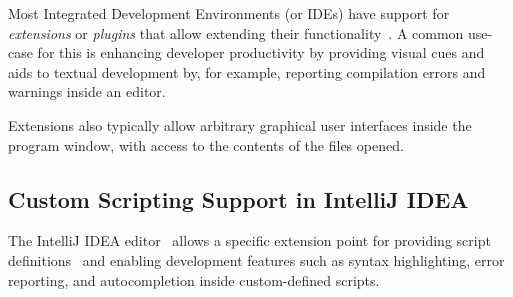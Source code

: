 Most Integrated Development Environments (or IDEs) have support for \emph{extensions} or \emph{plugins} that allow extending their functionality~\cite{ideaExtensionPoints, vscodeExtensions}.
A common use-case for this is enhancing developer productivity by providing visual cues and aids to textual development by, for example, reporting compilation errors and warnings inside an editor.

Extensions also typically allow arbitrary graphical user interfaces inside the program window, with access to the contents of the files opened.

\subsection{Custom Scripting Support in IntelliJ IDEA}\label{subsec:scripting-in-intellij}

The IntelliJ IDEA editor~\cite{intelliJRepo} allows a specific extension point for providing script definitions~\cite{kotlinScriptKeep, ideaExtensionPoints} and enabling development features such as syntax highlighting, error reporting, and autocompletion inside custom-defined scripts.


